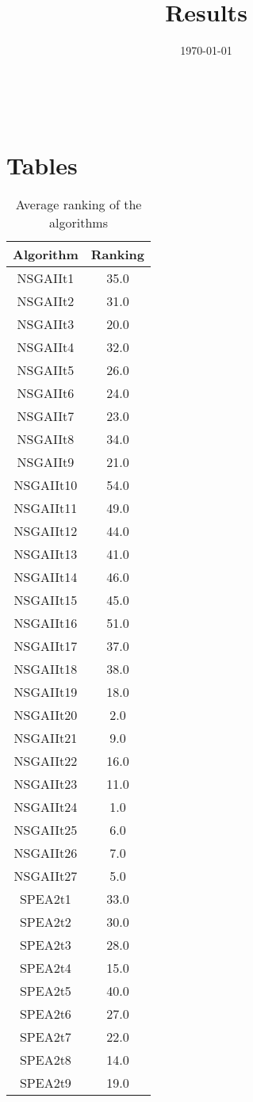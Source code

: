\documentclass{article}
\title{Results}
\author{}
\date{\today}
\begin{document}
\oddsidemargin 0in \topmargin 0in\maketitle
\
\section{Tables}
\begin{table}[!htp]
\centering
\caption{Average ranking of the algorithms}
\begin{tabular}{c|c}
Algorithm&Ranking\\
\hline
NSGAIIt1&35.0\\
NSGAIIt2&31.0\\
NSGAIIt3&20.0\\
NSGAIIt4&32.0\\
NSGAIIt5&26.0\\
NSGAIIt6&24.0\\
NSGAIIt7&23.0\\
NSGAIIt8&34.0\\
NSGAIIt9&21.0\\
NSGAIIt10&54.0\\
NSGAIIt11&49.0\\
NSGAIIt12&44.0\\
NSGAIIt13&41.0\\
NSGAIIt14&46.0\\
NSGAIIt15&45.0\\
NSGAIIt16&51.0\\
NSGAIIt17&37.0\\
NSGAIIt18&38.0\\
NSGAIIt19&18.0\\
NSGAIIt20&2.0\\
NSGAIIt21&9.0\\
NSGAIIt22&16.0\\
NSGAIIt23&11.0\\
NSGAIIt24&1.0\\
NSGAIIt25&6.0\\
NSGAIIt26&7.0\\
NSGAIIt27&5.0\\
SPEA2t1&33.0\\
SPEA2t2&30.0\\
SPEA2t3&28.0\\
SPEA2t4&15.0\\
SPEA2t5&40.0\\
SPEA2t6&27.0\\
SPEA2t7&22.0\\
SPEA2t8&14.0\\
SPEA2t9&19.0\\

\end{tabular}
\end{table}
\end{document}
